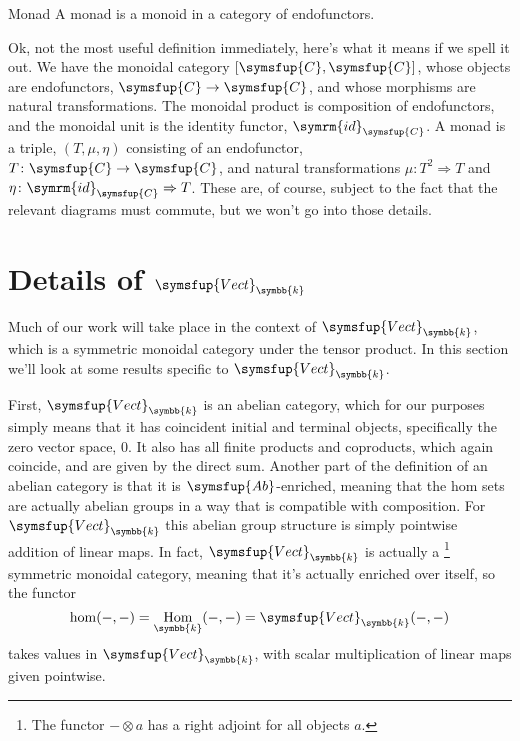 \documentclass[fleqn]{NotesClass}
\makeatletter
\newcommand{\cat}[1]{\symsfup{#1}}
\newcommand{\c@egory}[1]{\symsfup{#1}}
\newcommand{\Ab}{\c@egory{Ab}}
\newcommand{\Vect}[1][\field]{\c@egory{Vect}_{#1}}
\newcommand{\id}{\symrm{id}}
\newcommand{\natTrans}{\Rightarrow}
\renewcommand{\field}{\symbb{k}}
\DeclareMathOperator{\Hom}{Hom}
\makeatother
\begin{document}
    \begin{dfn}{Monad}{}
        A monad is a monoid in a category of endofunctors.
    \end{dfn}
    
    Ok, not the most useful definition immediately, here's what it means if we spell it out.
    We have the monoidal category \([\cat{C}, \cat{C}]\), whose objects are endofunctors, \(\cat{C} \to \cat{C}\), and whose morphisms are natural transformations.
    The monoidal product is composition of endofunctors, and the monoidal unit is the identity functor, \(\id_{\cat{C}}\).
    A monad is a triple, \((T, \mu, \eta)\) consisting of an endofunctor, \(T \colon \cat{C} \to \cat{C}\), and natural transformations \(\mu \colon T^2 \natTrans T\) and \(\eta \colon \id_{\cat{C}} \natTrans T\).
    These are, of course, subject to the fact that the relevant diagrams must commute, but we won't go into those details.
    
    \section{Details of \texorpdfstring{\(\Vect\)}{Vect k}}
    Much of our work will take place in the context of \(\Vect\), which is a symmetric monoidal category under the tensor product.
    In this section we'll look at some results specific to \(\Vect\).
    
    First, \(\Vect\) is an abelian category, which for our purposes simply means that it has coincident initial and terminal objects, specifically the zero vector space, \(0\).
    It also has all finite products and coproducts, which again coincide, and are given by the direct sum.
    Another part of the definition of an abelian category is that it is \(\Ab\)-enriched, meaning that the hom sets are actually abelian groups in a way that is compatible with composition.
    For \(\Vect\) this abelian group structure is simply pointwise addition of linear maps.
    In fact, \(\Vect\) is actually a \footnote{The functor \(- \otimes a\) has a right adjoint for all objects \(a\).} symmetric monoidal category, meaning that it's actually enriched over itself, so the functor
    \begin{equation}
        \hom(-, -) = \Hom_{\field}(-, -) = \Vect(-, -)
    \end{equation}
    takes values in \(\Vect\), with scalar multiplication of linear maps given pointwise.
    
\end{document}
